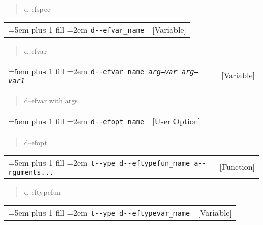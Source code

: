 \documentclass{book}
\begin{document}
\begin{titlepage}
%
\begin{quote}
\unskip{\parskip=0pt\noindent}%
d--efspec
\end{quote}


\noindent\begin{tabularx}{\linewidth}{@{}Xr}
\rightskip=5em plus 1 fill
\hangindent=2em
\texttt{d{-}{-}efvar\_name}& [Variable]
\end{tabularx}

%
\begin{quote}
\unskip{\parskip=0pt\noindent}%
d--efvar
\end{quote}


\noindent\begin{tabularx}{\linewidth}{@{}Xr}
\rightskip=5em plus 1 fill
\hangindent=2em
\texttt{d{-}{-}efvar\_name \EmbracOn{}\textnormal{\textsl{arg--var arg--var1}}\EmbracOff{}}& [Variable]
\end{tabularx}

%
\begin{quote}
\unskip{\parskip=0pt\noindent}%
d--efvar with args
\end{quote}


\noindent\begin{tabularx}{\linewidth}{@{}Xr}
\rightskip=5em plus 1 fill
\hangindent=2em
\texttt{d{-}{-}efopt\_name}& [User Option]
\end{tabularx}

%
\begin{quote}
\unskip{\parskip=0pt\noindent}%
d--efopt
\end{quote}


\noindent\begin{tabularx}{\linewidth}{@{}Xr}
\rightskip=5em plus 1 fill
\hangindent=2em
\texttt{t{-}{-}ype d{-}{-}eftypefun\_name a{-}{-}rguments...}& [Function]
\end{tabularx}

%
\begin{quote}
\unskip{\parskip=0pt\noindent}%
d--eftypefun
\end{quote}


\noindent\begin{tabularx}{\linewidth}{@{}Xr}
\rightskip=5em plus 1 fill
\hangindent=2em
\texttt{t{-}{-}ype d{-}{-}eftypevar\_name}& [Variable]
\end{tabularx}


\end{titlepage}
\end{document}
